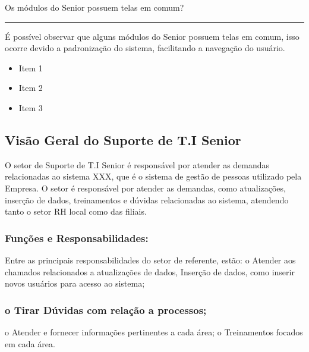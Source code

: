\documentclass[letterpaper,10pt,portuges]{sphinxmanual}
\begin{document}
\sphinxAtStartPar
Os módulos do Senior possuem telas em comum?


\bigskip\hrule\bigskip


\sphinxAtStartPar
É possível observar que alguns módulos do Senior possuem telas em comum, isso ocorre devido a padronização do sistema,
facilitando a navegação do usuário.
\begin{itemize}
\item {} 
\sphinxAtStartPar
Item 1

\item {} 
\sphinxAtStartPar
Item 2

\item {} 
\sphinxAtStartPar
Item 3

\end{itemize}

\noindent{}

\sphinxstepscope


\subsection{Visão Geral do Suporte de T.I Senior}
\label{\detokenize{visao_geral:visao-geral-do-suporte-de-t-i-senior}}\label{\detokenize{visao_geral::doc}}
\sphinxAtStartPar
O setor de Suporte de T.I Senior é responsável por atender as demandas
relacionadas ao sistema XXX, que é o sistema de gestão de pessoas
utilizado pela Empresa. O setor é responsável por atender as demandas, como atualizações, inserção de dados, treinamentos
e dúvidas relacionadas ao sistema, atendendo tanto o setor RH local como das filiais.


\subsubsection{Funções e Responsabilidades:}
\label{\detokenize{visao_geral:funcoes-e-responsabilidades}}
\sphinxAtStartPar
Entre as principais responsabilidades do setor de referente, estão:
o Atender aos chamados relacionados a atualizações de dados,
Inserção de dados, como inserir novos usuários para acesso ao
sistema;


\subsubsection{o Tirar Dúvidas com relação a processos;}
\label{\detokenize{visao_geral:o-tirar-duvidas-com-relacao-a-processos}}
\sphinxAtStartPar
o Atender e fornecer informações pertinentes a cada área;
o Treinamentos focados em cada área.
\end{document}
